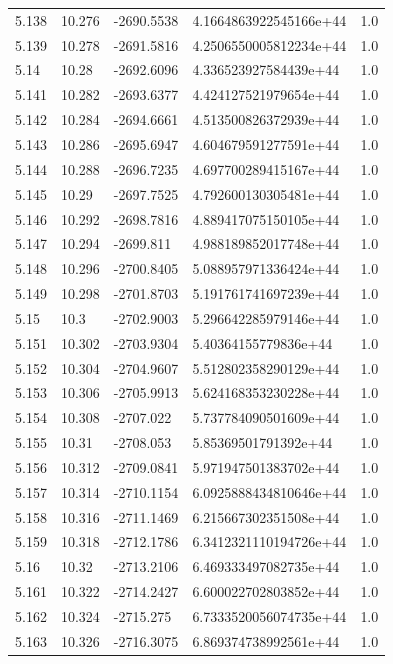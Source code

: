 \begin{tabular}{lllll}
5.138 & 10.276 & -2690.5538 & 4.1664863922545166e+44 & 1.0 \\
5.139 & 10.278 & -2691.5816 & 4.2506550005812234e+44 & 1.0 \\
5.14 & 10.28 & -2692.6096 & 4.336523927584439e+44 & 1.0 \\
5.141 & 10.282 & -2693.6377 & 4.424127521979654e+44 & 1.0 \\
5.142 & 10.284 & -2694.6661 & 4.513500826372939e+44 & 1.0 \\
5.143 & 10.286 & -2695.6947 & 4.604679591277591e+44 & 1.0 \\
5.144 & 10.288 & -2696.7235 & 4.697700289415167e+44 & 1.0 \\
5.145 & 10.29 & -2697.7525 & 4.792600130305481e+44 & 1.0 \\
5.146 & 10.292 & -2698.7816 & 4.889417075150105e+44 & 1.0 \\
5.147 & 10.294 & -2699.811 & 4.988189852017748e+44 & 1.0 \\
5.148 & 10.296 & -2700.8405 & 5.088957971336424e+44 & 1.0 \\
5.149 & 10.298 & -2701.8703 & 5.191761741697239e+44 & 1.0 \\
5.15 & 10.3 & -2702.9003 & 5.296642285979146e+44 & 1.0 \\
5.151 & 10.302 & -2703.9304 & 5.40364155779836e+44 & 1.0 \\
5.152 & 10.304 & -2704.9607 & 5.512802358290129e+44 & 1.0 \\
5.153 & 10.306 & -2705.9913 & 5.624168353230228e+44 & 1.0 \\
5.154 & 10.308 & -2707.022 & 5.737784090501609e+44 & 1.0 \\
5.155 & 10.31 & -2708.053 & 5.85369501791392e+44 & 1.0 \\
5.156 & 10.312 & -2709.0841 & 5.971947501383702e+44 & 1.0 \\
5.157 & 10.314 & -2710.1154 & 6.0925888434810646e+44 & 1.0 \\
5.158 & 10.316 & -2711.1469 & 6.215667302351508e+44 & 1.0 \\
5.159 & 10.318 & -2712.1786 & 6.3412321110194726e+44 & 1.0 \\
5.16 & 10.32 & -2713.2106 & 6.469333497082735e+44 & 1.0 \\
5.161 & 10.322 & -2714.2427 & 6.600022702803852e+44 & 1.0 \\
5.162 & 10.324 & -2715.275 & 6.7333520056074735e+44 & 1.0 \\
5.163 & 10.326 & -2716.3075 & 6.869374738992561e+44 & 1.0 \\

\end{tabular}
